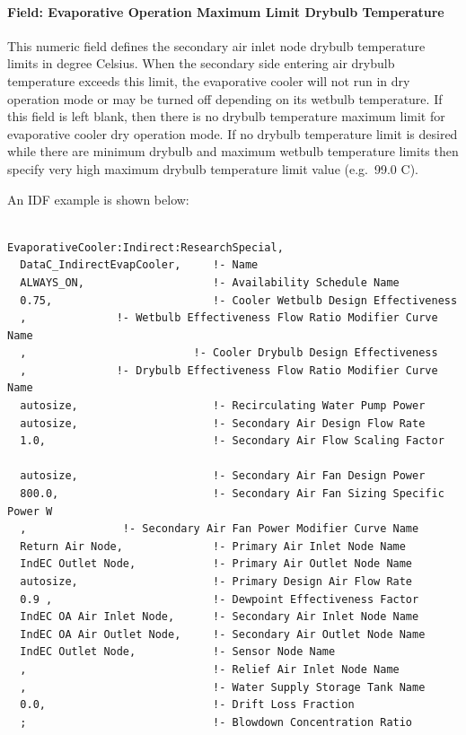 \paragraph{Field: Evaporative Operation Maximum Limit Drybulb Temperature}\label{field-evaporative-operation-maximum-limit-drybulb-temperature-1}

This numeric field defines the secondary air inlet node drybulb temperature limits in degree Celsius. When the secondary side entering air drybulb temperature exceeds this limit, the evaporative cooler will not run in dry operation mode or may be turned off depending on its wetbulb temperature. If this field is left blank, then there is no drybulb temperature maximum limit for evaporative cooler dry operation mode. If no drybulb temperature limit is desired while there are minimum drybulb and maximum wetbulb temperature limits then specify very high maximum drybulb temperature limit value (e.g.~99.0 C).

An IDF example is shown below:

\begin{lstlisting}

EvaporativeCooler:Indirect:ResearchSpecial,
  DataC_IndirectEvapCooler,     !- Name
  ALWAYS_ON,                    !- Availability Schedule Name
  0.75,                         !- Cooler Wetbulb Design Effectiveness
  ,              !- Wetbulb Effectiveness Flow Ratio Modifier Curve Name
  ,                          !- Cooler Drybulb Design Effectiveness
  ,              !- Drybulb Effectiveness Flow Ratio Modifier Curve Name
  autosize,                     !- Recirculating Water Pump Power
  autosize,                     !- Secondary Air Design Flow Rate
  1.0,                          !- Secondary Air Flow Scaling Factor

  autosize,                     !- Secondary Air Fan Design Power
  800.0,                        !- Secondary Air Fan Sizing Specific Power W
  ,               !- Secondary Air Fan Power Modifier Curve Name
  Return Air Node,              !- Primary Air Inlet Node Name
  IndEC Outlet Node,            !- Primary Air Outlet Node Name
  autosize,                     !- Primary Design Air Flow Rate
  0.9 ,                         !- Dewpoint Effectiveness Factor
  IndEC OA Air Inlet Node,      !- Secondary Air Inlet Node Name
  IndEC OA Air Outlet Node,     !- Secondary Air Outlet Node Name
  IndEC Outlet Node,            !- Sensor Node Name
  ,                             !- Relief Air Inlet Node Name
  ,                             !- Water Supply Storage Tank Name
  0.0,                          !- Drift Loss Fraction
  ;                             !- Blowdown Concentration Ratio
\end{lstlisting}

